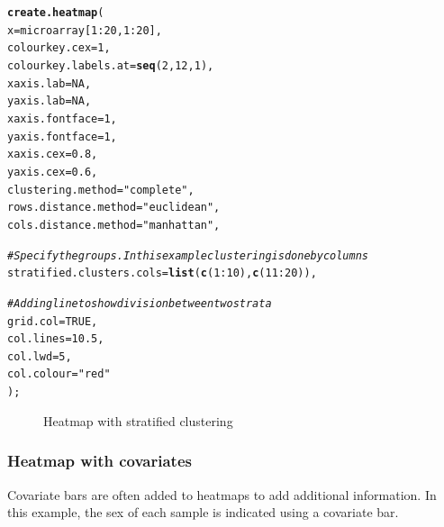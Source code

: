 \documentclass[letterpaper]{article}\usepackage[]{graphicx}\usepackage[]{color}
\makeatletter
\newcommand{\hlnum}[1]{\textcolor[rgb]{0.686,0.059,0.569}{#1}}%
\newcommand{\hlstr}[1]{\textcolor[rgb]{0.192,0.494,0.8}{#1}}%
\newcommand{\hlcom}[1]{\textcolor[rgb]{0.678,0.584,0.686}{\textit{#1}}}%
\newcommand{\hlopt}[1]{\textcolor[rgb]{0,0,0}{#1}}%
\newcommand{\hlstd}[1]{\textcolor[rgb]{0.345,0.345,0.345}{#1}}%
\newcommand{\hlkwc}[1]{\textcolor[rgb]{0.333,0.667,0.333}{#1}}%
\newcommand{\hlkwd}[1]{\textcolor[rgb]{0.737,0.353,0.396}{\textbf{#1}}}%
\newenvironment{kframe}{%
 \def\at@end@of@kframe{}%
 \ifinner\ifhmode%
  \def\at@end@of@kframe{\end{minipage}}%
  \begin{minipage}{\columnwidth}%
 \fi\fi%
 \def\FrameCommand##1{\hskip\@totalleftmargin \hskip-\fboxsep
 \colorbox{shadecolor}{##1}\hskip-\fboxsep
     \hskip-\linewidth \hskip-\@totalleftmargin \hskip\columnwidth}%
 \MakeFramed {\advance\hsize-\width
   \@totalleftmargin\z@ \linewidth\hsize
   \@setminipage}}%
 {\par\unskip\endMakeFramed%
 \at@end@of@kframe}
\newenvironment{knitrout}{}{} %
\makeatother
\begin{document}
\begin{knitrout}
\color{fgcolor}\begin{kframe}
\begin{alltt}
\hlkwd{create.heatmap}\hlstd{(}
    \hlkwc{x} \hlstd{= microarray[}\hlnum{1}\hlopt{:}\hlnum{20}\hlstd{,} \hlnum{1}\hlopt{:}\hlnum{20}\hlstd{],}
    \hlkwc{colourkey.cex} \hlstd{=} \hlnum{1}\hlstd{,}
    \hlkwc{colourkey.labels.at} \hlstd{=} \hlkwd{seq}\hlstd{(}\hlnum{2}\hlstd{,} \hlnum{12}\hlstd{,} \hlnum{1}\hlstd{),}
    \hlkwc{xaxis.lab} \hlstd{=} \hlnum{NA}\hlstd{,}
    \hlkwc{yaxis.lab} \hlstd{=} \hlnum{NA}\hlstd{,}
    \hlkwc{xaxis.fontface} \hlstd{=} \hlnum{1}\hlstd{,}
    \hlkwc{yaxis.fontface} \hlstd{=} \hlnum{1}\hlstd{,}
     \hlkwc{xaxis.cex} \hlstd{=} \hlnum{0.8}\hlstd{,}
    \hlkwc{yaxis.cex} \hlstd{=} \hlnum{0.6}\hlstd{,}
    \hlkwc{clustering.method} \hlstd{=} \hlstr{"complete"}\hlstd{,}
    \hlkwc{rows.distance.method} \hlstd{=} \hlstr{"euclidean"}\hlstd{,}
    \hlkwc{cols.distance.method} \hlstd{=} \hlstr{"manhattan"}\hlstd{,}

    \hlcom{# Specify the groups. In this example clustering is done by columns}
    \hlkwc{stratified.clusters.cols} \hlstd{=} \hlkwd{list}\hlstd{(}\hlkwd{c}\hlstd{(}\hlnum{1}\hlopt{:}\hlnum{10}\hlstd{),} \hlkwd{c}\hlstd{(}\hlnum{11}\hlopt{:}\hlnum{20}\hlstd{)),}

    \hlcom{# Adding line to show division between two strata}
    \hlkwc{grid.col} \hlstd{=} \hlnum{TRUE}\hlstd{,}
    \hlkwc{col.lines} \hlstd{=} \hlnum{10.5}\hlstd{,}
    \hlkwc{col.lwd} \hlstd{=} \hlnum{5}\hlstd{,}
    \hlkwc{col.colour} \hlstd{=} \hlstr{"red"}
    \hlstd{);}
\end{alltt}
\end{kframe}\begin{figure}[]


{\centering {} 

}

\caption[Heatmap with stratified clustering]{Heatmap with stratified clustering\label{fig:heatmap4}}
\end{figure}


\end{knitrout}

\subsubsection{Heatmap with covariates}
Covariate bars are often added to heatmaps to add additional information. In this example, the sex of each sample is indicated using a covariate bar.
\end{document}
